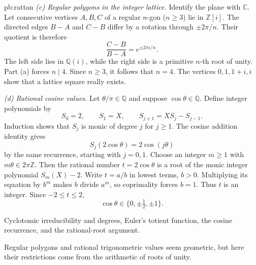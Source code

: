 \begin{solution}{pb:rattan}
\emph{(c) Regular polygons in the integer lattice.}
Identify the plane with $\mathbb C$. Let consecutive vertices $A,B,C$ of a regular $n$-gon ($n\ge3$) lie in $\mathbb Z[i]$. The directed edges $B-A$ and $C-B$ differ by a rotation through $\pm2\pi/n$. Their quotient is therefore
\[
\frac{C-B}{B-A}=e^{\pm2\pi i/n}.
\]
The left side lies in $\mathbb Q(i)$, while the right side is a primitive $n$-th root of unity. Part (a) forces $n\mid4$. Since $n\ge3$, it follows that $n=4$. The vertices $0,1,1+i,i$ show that a lattice square really exists.

\emph{(d) Rational cosine values.}
Let $\theta/\pi\in\mathbb Q$ and suppose $\cos\theta\in\mathbb Q$.
Define integer polynomials by
\[
S_0=2,\qquad S_1=X,\qquad S_{j+1}=XS_j-S_{j-1}.
\]
Induction shows that $S_j$ is monic of degree $j$ for $j\ge1$.
The cosine addition identity gives
\[
S_j(2\cos\theta)=2\cos(j\theta)
\]
by the same recurrence, starting with $j=0,1$.
Choose an integer $m\ge1$ with $m\theta\in2\pi\mathbb Z$.
Then the rational number $t=2\cos\theta$ is a root of the monic
integer polynomial $S_m(X)-2$. Write $t=a/b$ in lowest terms, $b>0$.
Multiplying its equation by $b^m$ makes $b$ divide $a^m$, so coprimality
forces $b=1$. Thus $t$ is an integer. Since $-2\le t\le2$,
\[
\boxed{\cos\theta\in\{0,\pm\tfrac12,\pm1\}.}
\]

\tools Cyclotomic irreducibility and degrees, Euler's totient function, the cosine recurrence, and the rational-root argument.

\leads Regular polygons and rational trigonometric values seem geometric, but here their restrictions come from the arithmetic of roots of unity.
\end{solution}

